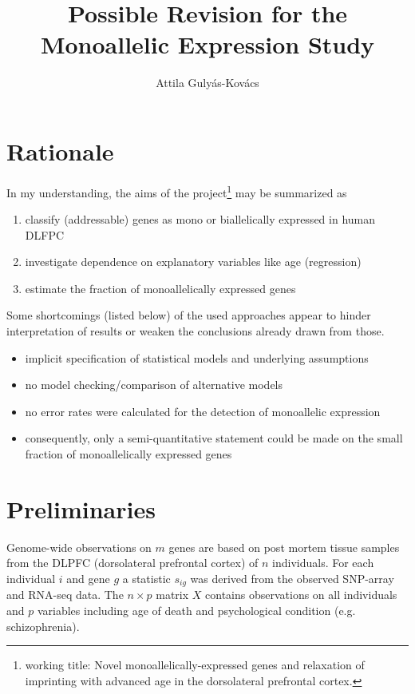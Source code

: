 \documentclass{article}
\title{Possible Revision for the Monoallelic Expression Study}
\author{Attila Gulyás-Kovács}
\begin{document}
\maketitle

\section{Rationale}

In my understanding, the aims of the project\footnote{working title: Novel
monoallelically-expressed genes and relaxation of imprinting with advanced age
in the dorsolateral prefrontal cortex.} may be summarized as
\begin{enumerate}
\item classify (addressable) genes as mono or biallelically expressed in human DLFPC
\item investigate dependence on explanatory variables like age (regression)
\item estimate the fraction of monoallelically expressed genes 
\end{enumerate}

Some shortcomings (listed below) of the used approaches appear to hinder interpretation of results or
weaken the conclusions already drawn from those.
\begin{itemize}
\item implicit specification of statistical models and underlying assumptions
\item no model checking/comparison of alternative models
\item no error rates were calculated for the detection of monoallelic expression
\item consequently, only a semi-quantitative statement could be made on the
small fraction of monoallelically expressed genes
\end{itemize}

\section{Preliminaries}

Genome-wide observations on $m$ genes are based on post mortem tissue samples from the DLPFC
(dorsolateral prefrontal cortex) of $n$ individuals.  For each individual $i$ and gene $g$ a
statistic $s_{ig}$ was derived from the observed SNP-array and RNA-seq data.  The $n \times p$
matrix $X$ contains observations on all individuals and $p$ variables including age of death and
psychological condition (e.g. schizophrenia).
\end{document}
